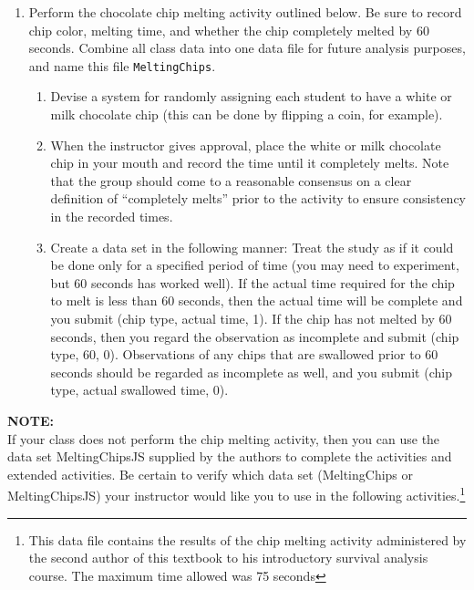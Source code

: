 \documentclass[
]{report}
\providecommand{\tightlist}{%
  \setlength{\itemsep}{0pt}\setlength{\parskip}{0pt}}
\begin{document}
\begin{enumerate}
\def\labelenumi{\arabic{enumi}.}
\tightlist
\item
  Perform the chocolate chip melting activity outlined below. Be sure to record chip color, melting time, and whether the chip completely melted by 60 seconds. Combine all class data into one data file for future analysis purposes, and name this file \texttt{MeltingChips}.

  \begin{enumerate}
  \def\labelenumii{\alph{enumii}.}
  \tightlist
  \item
    Devise a system for randomly assigning each student to have a white or milk chocolate chip (this can be done by flipping a coin, for example).\\
  \item
    When the instructor gives approval, place the white or milk chocolate chip in your mouth and record the time until it completely melts. Note that the group should come to a reasonable consensus on a clear definition of ``completely melts'' prior to the activity to ensure consistency in the recorded times.\\
  \item
    Create a data set in the following manner: Treat the study as if it could be done only for a specified period of time (you may need to experiment, but 60 seconds has worked well). If the actual time required for the chip to melt is less than 60 seconds, then the actual time will be complete and you submit (chip type, actual time, 1). If the chip has not melted by 60 seconds, then you regard the observation as incomplete and submit (chip type, 60, 0). Observations of any chips that are swallowed prior to 60 seconds should be regarded as incomplete as well, and you submit (chip type, actual swallowed time, 0).
  \end{enumerate}
\end{enumerate}

\large

\textbf{NOTE:}\\
If your class does not perform the chip melting activity, then you can use the data set MeltingChipsJS
supplied by the authors to complete the activities and extended activities. Be certain to verify which
data set (MeltingChips or MeltingChipsJS) your instructor would like you to use in the following
activities.\footnote{This data file contains the results of the chip melting activity administered by the second author of this textbook to his
  introductory survival analysis course. The maximum time allowed was 75 seconds}
\normalsize
\end{document}
